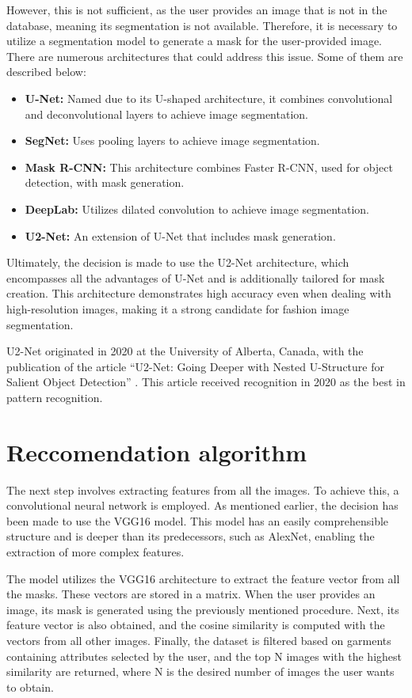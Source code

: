 \documentclass[12pt]{report} %
\begin{document}
However, this is not sufficient, as the user provides an image that is not in the database, meaning its segmentation is not available. Therefore, it is necessary to utilize a segmentation model to generate a mask for the user-provided image. There are numerous architectures that could address this issue. Some of them are described below:

\begin{itemize}
	\item \textbf{U-Net:} Named due to its U-shaped architecture, it combines convolutional and deconvolutional layers to achieve image segmentation.
	\item \textbf{SegNet:} Uses pooling layers to achieve image segmentation.
	\item \textbf{Mask R-CNN:} This architecture combines Faster R-CNN, used for object detection, with mask generation.
	\item \textbf{DeepLab:} Utilizes dilated convolution to achieve image segmentation.
	\item \textbf{U2-Net:} An extension of U-Net that includes mask generation.
\end{itemize}

Ultimately, the decision is made to use the U2-Net architecture, which encompasses all the advantages of U-Net and is additionally tailored for mask creation. This architecture demonstrates high accuracy even when dealing with high-resolution images, making it a strong candidate for fashion image segmentation.

U2-Net originated in 2020 at the University of Alberta, Canada, with the publication of the article ``U2-Net: Going Deeper with Nested U-Structure for Salient Object Detection'' \cite{u2net}. This article received recognition in 2020 as the best in pattern recognition.

\section*{Reccomendation algorithm}
The next step involves extracting features from all the images. To achieve this, a convolutional neural network is employed. As mentioned earlier, the decision has been made to use the VGG16 model. This model has an easily comprehensible structure and is deeper than its predecessors, such as AlexNet, enabling the extraction of more complex features.

The model utilizes the VGG16 architecture to extract the feature vector from all the masks. These vectors are stored in a matrix. When the user provides an image, its mask is generated using the previously mentioned procedure. Next, its feature vector is also obtained, and the cosine similarity is computed with the vectors from all other images. Finally, the dataset is filtered based on garments containing attributes selected by the user, and the top N images with the highest similarity are returned, where N is the desired number of images the user wants to obtain.
\end{document}
